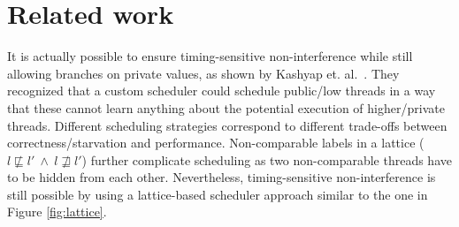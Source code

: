 \documentclass[10pt,preprint]{sigplanconf}
\newtheorem{theorem}{Theorem}
\begin{document}






\section{Related work}

It is actually possible to ensure timing-sensitive non-interference while still allowing branches on private values, as shown by Kashyap et. al.~\cite{kashyap2011}.  They recognized that a custom scheduler could schedule public/low threads in a way that these cannot learn anything about the potential execution of higher/private threads.  Different scheduling strategies correspond to different trade-offs between correctness/starvation and performance.  Non-comparable labels in a lattice ($l \not \sqsubseteq l'~\wedge~l \not \sqsupseteq l'$) further complicate scheduling as two non-comparable threads have to be hidden from each other.  Nevertheless, timing-sensitive non-interference is still possible by using a lattice-based scheduler approach similar to the one in Figure \ref{fig:lattice}.
\end{document}

